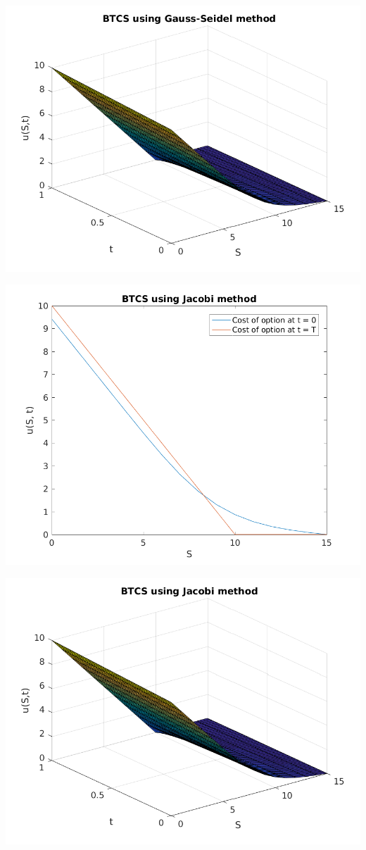 \documentclass{article}
\begin{document}
\includegraphics{"q2_6"}
\pagebreak


\includegraphics{"q2_7"}
\pagebreak


\includegraphics{"q2_8"}
\pagebreak
\end{document}
